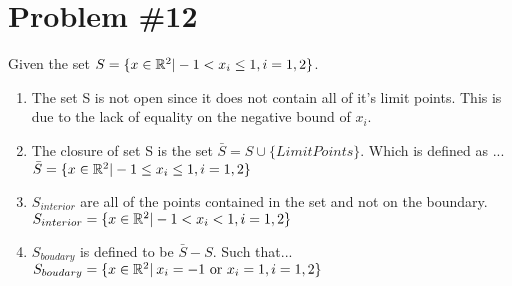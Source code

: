 
\section*{Problem \#12}

Given the set $S = \{x \in \mathbb{R}^2 | -1 < x_{i} \leq 1, i = 1,2\}$.

\begin{enumerate}
    \item The set S is not open since it does not contain all of it's limit points. This is due to the lack of equality on the negative bound of $x_i$.
    \item The closure of set S is the set $\bar{S} = S \cup \{ Limit Points \}$. Which is defined as ...\\  $\bar{S} = \{ x\in \mathbb{R}^2 | -1 \leq x_{i} \leq 1, i = 1,2 \}$

    \item $ S_{interior}$ are all of the points contained in the set and not on the boundary. \\

    $S_{interior} = \{ x \in \mathbb{R}^2 | -1 < x_{i} < 1, i = 1,2 \}$

    \item $S_{boudary}$ is defined to be $\bar{S} - S$. Such that... \\
    $S_{boudary} = \{ x\in\mathbb{R}^2 | \: x_{i} = -1 \text{ or } x_{i} =1, i = 1,2 \}$
\end{enumerate}
